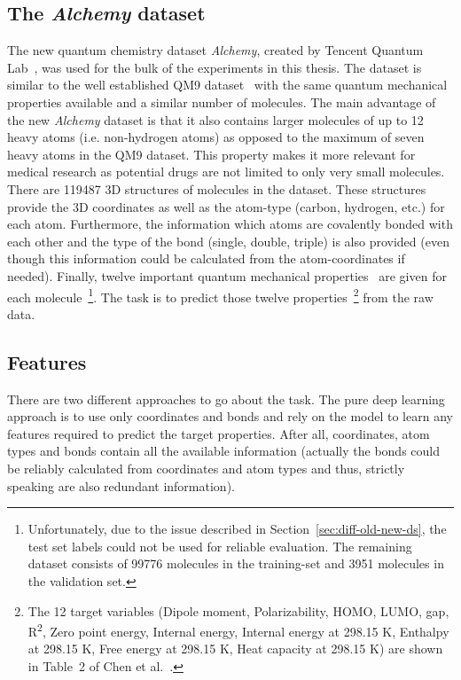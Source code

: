 \subsection{The \textit{Alchemy} dataset}
\label{sec:alchemy-dataset}
The new quantum chemistry dataset \textit{Alchemy}, created by Tencent Quantum Lab~\cite{Chen2019}, was used for the bulk of the experiments in this thesis. The dataset is similar to the well established QM9 dataset~\cite{Ramakrishnan2014} with the same quantum mechanical properties available and a similar number of molecules. The main advantage of the new \textit{Alchemy} dataset is that it also contains larger molecules of up to 12 heavy atoms (i.e. non-hydrogen atoms) as opposed to the maximum of seven heavy atoms in the QM9 dataset. This property makes it more relevant for medical research as potential drugs are not limited to only very small molecules. 
There are 119487 3D structures of molecules in the dataset. These structures provide the 3D coordinates as well as the atom-type (carbon, hydrogen, etc.) for each atom. Furthermore, the information which atoms are covalently bonded with each other and the type of the bond (single, double, triple) is also provided (even though this information could be calculated from the atom-coordinates if needed). Finally, twelve important quantum mechanical properties~\cite{Chen2019} are given for each molecule~\footnote{
	Unfortunately, due to the issue described in Section~\ref{sec:diff-old-new-ds}, the test set labels could not be used for reliable evaluation. The remaining dataset consists of 99776 molecules in the training-set and 3951 molecules in the validation set.
}. The task is to predict those twelve properties~\footnote{
	The 12 target variables
	(Dipole moment, Polarizability, HOMO, LUMO, gap, R\textsuperscript2, Zero point energy, Internal energy, Internal energy at 298.15 K, Enthalpy at 298.15 K, Free energy at 298.15 K, Heat capacity at 298.15 K) are shown in Table~2 of Chen et al.~\cite{Chen2019}.
} from the raw data.



\subsection{Features}
\label{sec:features}

There are two different approaches to go about the task. The pure deep learning approach is to use only coordinates and bonds and rely on the model to learn any features required to predict the target properties. After all, coordinates, atom types and bonds contain all the available information (actually the bonds could be reliably calculated from coordinates and atom types and thus, strictly speaking are also redundant information).


